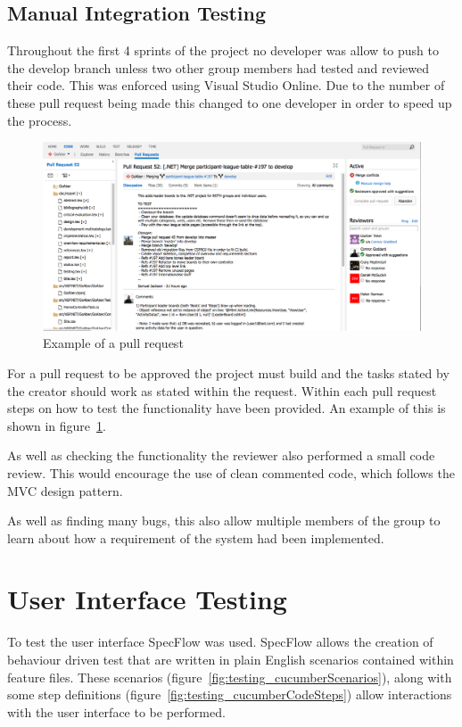 \subsection{Manual Integration Testing}
Throughout the first 4 sprints of the project no developer was allow to push to the develop branch unless two other group members had tested and reviewed their code. This was enforced using Visual Studio Online. Due to the number of these pull request being made this changed to one developer in order to speed up the process.

\begin{figure}[H]
\begin{center}
\includegraphics[scale=0.3]{images/testing/PullRequest.png} 
\caption{Example of a pull request}
\label{fig:testing_pullRequest}
\end{center}
\end{figure}

For a pull request to be approved the project must build and the tasks stated by the creator should work as stated within the request. Within each pull request steps on how to test the functionality have been provided. An example of this is shown in figure~\ref{fig:testing_pullRequest}.

As well as checking the functionality the reviewer also performed a small code review. This would encourage the use of clean commented code, which follows the MVC design pattern.

As well as finding many bugs, this also allow multiple members of the group to learn about how a requirement of the system had been implemented.

\section{User Interface Testing}

To test the user interface SpecFlow \cite{SpecFlow} was used. SpecFlow allows the creation of behaviour driven test that are written in plain English scenarios contained within feature files. These scenarios (figure~\ref{fig:testing_cucumberScenarios}), along with some step definitions (figure~\ref{fig:testing_cucumberCodeSteps}) allow interactions with the user interface to be performed. 

